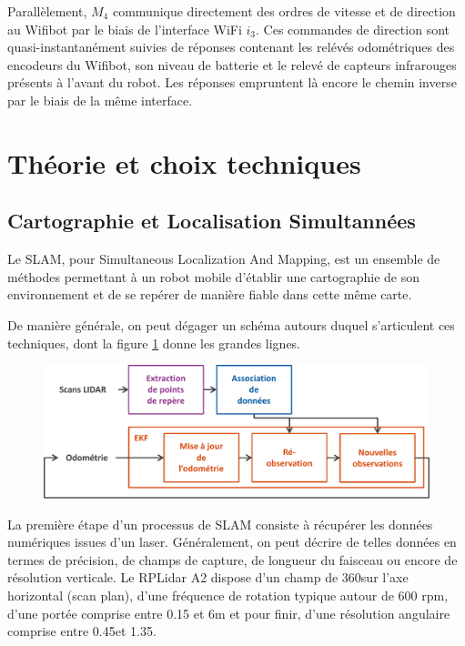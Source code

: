 Parallèlement, $M_{4}$ communique directement des ordres de vitesse et de direction au Wifibot par le biais de l'interface WiFi $i_{3}$. 
Ces commandes de direction sont quasi-instantanément suivies de réponses contenant les relévés odométriques des encodeurs du Wifibot, son niveau de batterie et le relevé de capteurs infrarouges présents 
à l'avant du robot. Les réponses empruntent là encore le chemin inverse par le biais de la même interface. 

\section{Théorie et choix techniques}

  \subsection{Cartographie et Localisation Simultannées}
  
Le SLAM, pour Simultaneous Localization And Mapping, est un ensemble de méthodes permettant à un robot mobile d'établir une cartographie de son environnement et de se repérer de manière fiable dans cette même carte. 
 
De manière générale, on peut dégager un schéma autours duquel s'articulent ces techniques, dont la figure \ref{fig:slam-proc} donne les grandes lignes.

\begin{figure}[h]
  \centering
    \includegraphics[width=.8\linewidth]{figures/slam-proc-h}  
  \label{fig:slam-proc}
\end{figure}

La première étape d'un processus de SLAM consiste à récupérer les données numériques issues d'un laser. 
Généralement, on peut décrire de telles données en termes de précision, de champs de capture, de longueur du faisceau ou encore de résolution verticale. 
Le RPLidar A2 dispose d'un champ de 360\degre sur l'axe horizontal (scan plan), d'une fréquence de rotation typique autour de 600 rpm, d'une portée comprise entre 0.15 et 6m et pour finir, d'une résolution angulaire comprise entre 
0.45\degre et 1.35\degre.

